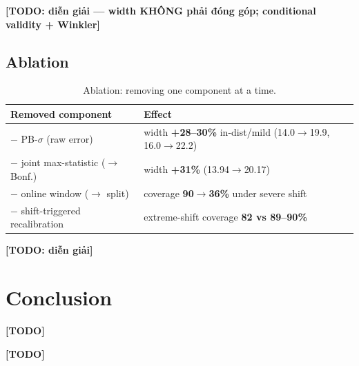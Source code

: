 \documentclass[pdflatex,sn-mathphys,Numbered]{sn-jnl}
\theoremstyle{remark}
\begin{document}
\textbf{[TODO: diễn giải — width KHÔNG phải đóng góp; conditional validity + Winkler]}

\subsection{Ablation}\label{sec:ablation}

\begin{table}[t]
\caption{Ablation: removing one component at a time.}
\label{tab:ablation}
\begin{tabular}{@{}ll@{}}
\toprule
Removed component & Effect \\
\midrule
$-$ PB-$\sigma$ (raw error)            & width \textbf{+28--30\%} in-dist/mild (14.0$\to$19.9, 16.0$\to$22.2) \\
$-$ joint max-statistic ($\to$ Bonf.) & width \textbf{+31\%} (13.94$\to$20.17) \\
$-$ online window ($\to$ split)       & coverage \textbf{90$\to$36\%} under severe shift \\
$-$ shift-triggered recalibration     & extreme-shift coverage \textbf{82 vs 89--90\%} \\
\bottomrule
\end{tabular}
\end{table}

\textbf{[TODO: diễn giải]}

\section{Conclusion}\label{sec:conclusion}
\textbf{[TODO]}

\backmatter

\textbf{[TODO]}

% 
\end{document}
